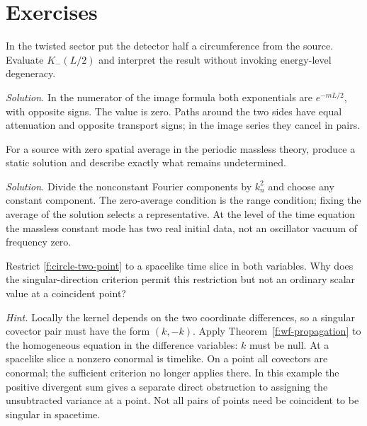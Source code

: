 \section*{Exercises}
\begin{exercise}In the twisted sector put the detector half a circumference from the source. Evaluate $K_-(L/2)$ and interpret the result without invoking energy-level degeneracy.\end{exercise}
\noindent\emph{Solution.} In the numerator of the image formula both exponentials are $e^{-mL/2}$, with opposite signs. The value is zero. Paths around the two sides have equal attenuation and opposite transport signs; in the image series they cancel in pairs.
\begin{exercise}For a source with zero spatial average in the periodic massless theory, produce a static solution and describe exactly what remains undetermined.\end{exercise}
\noindent\emph{Solution.} Divide the nonconstant Fourier components by $k_n^2$ and choose any constant component. The zero-average condition is the range condition; fixing the average of the solution selects a representative. At the level of the time equation the massless constant mode has two real initial data, not an oscillator vacuum of frequency zero.
\begin{exercise}Restrict \eqref{f:circle-two-point} to a spacelike time slice in both variables. Why does the singular-direction criterion permit this restriction but not an ordinary scalar value at a coincident point?\end{exercise}
\noindent\emph{Hint.} Locally the kernel depends on the two coordinate differences, so a singular covector pair must have the form $(k,-k)$. Apply Theorem~\ref{f:wf-propagation} to the homogeneous equation in the difference variables: $k$ must be null. At a spacelike slice a nonzero conormal is timelike. On a point all covectors are conormal; the sufficient criterion no longer applies there. In this example the positive divergent sum gives a separate direct obstruction to assigning the unsubtracted variance at a point. Not all pairs of points need be coincident to be singular in spacetime.
